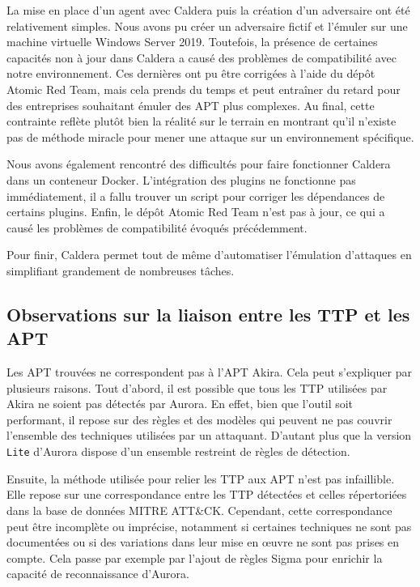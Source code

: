 \documentclass[12pt,letterpaper]{article}
\begin{document}
La mise en place d'un agent avec Caldera puis la création d'un adversaire ont été relativement simples.
Nous avons pu créer un adversaire fictif et l'émuler sur une machine virtuelle Windows Server 2019.
Toutefois, la présence de certaines capacités non à jour dans Caldera a causé des problèmes de compatibilité avec notre environnement. 
Ces dernières ont pu être corrigées à l'aide du dépôt Atomic Red Team, mais cela prends du temps et peut entraîner du retard pour des entreprises souhaitant émuler des APT plus complexes.
Au final, cette contrainte reflète plutôt bien la réalité sur le terrain en montrant qu'il n'existe pas de méthode miracle pour mener une attaque sur un environnement spécifique.

\bigskip

Nous avons également rencontré des difficultés pour faire fonctionner Caldera dans un conteneur Docker.
L'intégration des plugins ne fonctionne pas immédiatement, il a fallu trouver un script pour corriger les dépendances de certains plugins.
Enfin, le dépôt Atomic Red Team n'est pas à jour, ce qui a causé les problèmes de compatibilité évoqués précédemment.

\bigskip

Pour finir, Caldera permet tout de même d'automatiser l'émulation d'attaques en simplifiant grandement de nombreuses tâches.

\subsection{Observations sur la liaison entre les TTP et les APT}
Les APT trouvées ne correspondent pas à l'APT Akira. Cela peut s'expliquer par plusieurs raisons.
Tout d'abord, il est possible que tous les TTP utilisées par Akira ne soient pas détectés par Aurora.
En effet, bien que l'outil soit performant, il repose sur des règles et des modèles qui peuvent ne pas couvrir l'ensemble des techniques utilisées par un attaquant.
D'autant plus que la version \verb|Lite| d'Aurora dispose d'un ensemble restreint de règles de détection.

\bigskip

Ensuite, la méthode utilisée pour relier les TTP aux APT n'est pas infaillible.
Elle repose sur une correspondance entre les TTP détectées et celles répertoriées dans la base de données MITRE ATT\&CK.
Cependant, cette correspondance peut être incomplète ou imprécise, notamment si certaines techniques ne sont pas documentées ou si des variations dans leur mise en œuvre ne sont pas prises en compte.
Cela passe par exemple par l'ajout de règles Sigma pour enrichir la capacité de reconnaissance d'Aurora.
\end{document}
